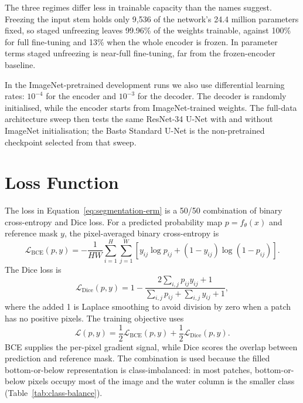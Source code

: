 The three regimes differ less in trainable capacity than the names suggest. Freezing the input stem holds only 9{,}536 of the network's 24.4 million parameters fixed, so staged unfreezing leaves 99.96\% of the weights trainable, against 100\% for full fine-tuning and 13\% when the whole encoder is frozen. In parameter terms staged unfreezing is near-full fine-tuning, far from the frozen-encoder baseline.

In the ImageNet-pretrained development runs we also use differential learning rates: $10^{-4}$ for the encoder and $10^{-3}$ for the decoder. The decoder is randomly initialised, while the encoder starts from ImageNet-trained weights. The full-data architecture sweep then tests the same ResNet-34 U-Net with and without ImageNet initialisation; the Bast\o{} Standard U-Net is the non-pretrained checkpoint selected from that sweep.


\section{Loss Function}

The loss in Equation~\ref{eq:segmentation-erm} is a 50/50 combination of binary cross-entropy and Dice loss. For a predicted probability map $p=f_\theta(x)$ and reference mask $y$, the pixel-averaged binary cross-entropy is
\begin{equation}
    \mathcal{L}_{\mathrm{BCE}}(p,y)
    =
    -\frac{1}{HW}
    \sum_{i=1}^{H}\sum_{j=1}^{W}
    \left[
        y_{ij}\log p_{ij}
        +
        (1-y_{ij})\log(1-p_{ij})
    \right].
\end{equation}
The Dice loss is
\begin{equation}
    \mathcal{L}_{\mathrm{Dice}}(p,y)
    =
    1 -
    \frac{2\sum_{i,j} p_{ij}y_{ij} + 1}
         {\sum_{i,j} p_{ij} + \sum_{i,j} y_{ij} + 1},
\end{equation}
where the added 1 is Laplace smoothing to avoid division by zero when a patch has no positive pixels. The training objective uses
\begin{equation}
    \mathcal{L}(p,y)
    =
    \frac{1}{2}\mathcal{L}_{\mathrm{BCE}}(p,y)
    +
    \frac{1}{2}\mathcal{L}_{\mathrm{Dice}}(p,y).
\end{equation}
BCE supplies the per-pixel gradient signal, while Dice scores the overlap between prediction and reference mask. The combination is used because the filled bottom-or-below representation is class-imbalanced: in most patches, bottom-or-below pixels occupy most of the image and the water column is the smaller class (Table~\ref{tab:class-balance}).


